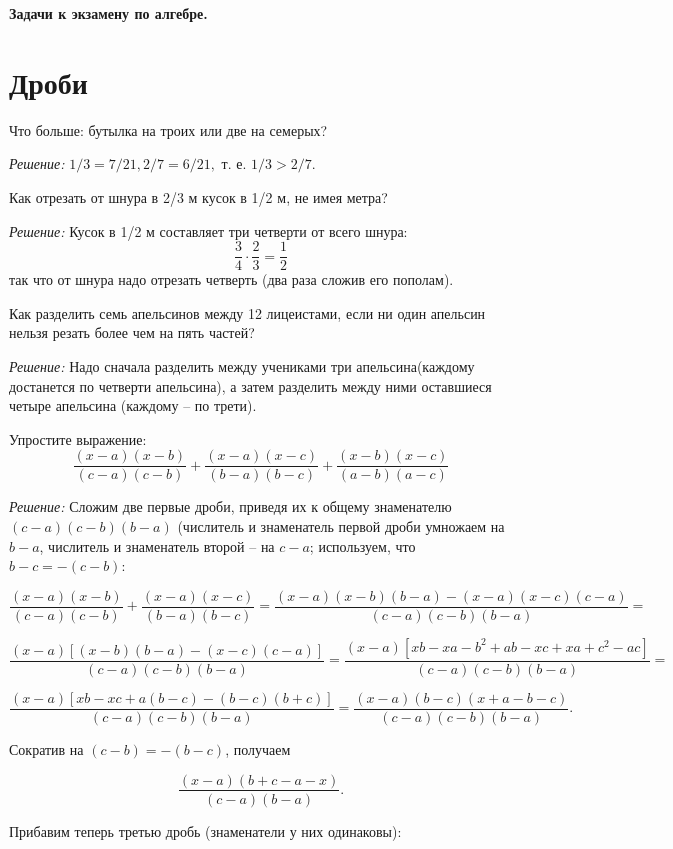 \centerline{\Huge \bf  Задачи к экзамену по алгебре.}

\section{\Large \bf Дроби}

 Что больше: бутылка на троих или две на семерых?

\textit{Решение:} $1/3 = 7/21, 2/7 = 6/21,$ т. е. $1/3 > 2/7.$

 Как отрезать от шнура в 2/3 м кусок в 1/2 м, не имея метра?

\textit{Решение:} Кусок в 1/2 м составляет три четверти от всего шнура:
\[ \dfrac{3}{4} \cdot \dfrac{2}{3} = \dfrac{1}{2}\]
так что от шнура надо отрезать четверть (два раза сложив его пополам).


 Как разделить семь апельсинов между 12 лицеистами, если ни один апельсин нельзя резать более чем на пять частей?

\textit{Решение:} Надо сначала разделить между учениками три апельсина(каждому достанется по четверти апельсина), а затем разделить между ними оставшиеся четыре апельсина (каждому $–$ по трети).

Упростите выражение:
\[
\frac{(x-a)(x-b)}{(c-a)(c-b)} + \frac{(x-a)(x-c)}{(b-a)(b-c)} + \frac{(x-b)(x-c)}{(a-b)(a-c)}
\]



\textit{Решение:} Сложим две первые дроби, приведя их к общему знаменателю \((c-a)(c-b)(b-a)\) (числитель и знаменатель первой дроби умножаем на \(b-a\), числитель и знаменатель второй -- на \(c-a\); используем, что $b - c = -(c - b):$


\[
\frac{(x-a)(x-b)}{(c-a)(c-b)} + \frac{(x-a)(x-c)}{(b-a)(b-c)} =
\frac{(x-a)(x-b)(b-a)-(x-a)(x-c)(c-a)}{(c-a)(c-b)(b-a)} =
\]

\[
\frac{(x-a)[(x-b)(b-a)-(x-c)(c-a)]}{(c-a)(c-b)(b-a)} =
\frac{(x-a)[xb - xa - b^2 + ab - xc + xa + c^2 - ac]}{(c-a)(c-b)(b-a)} =
\]

\[
\frac{(x-a)[xb - xc + a(b - c) - (b - c)(b + c)]}{(c-a)(c-b)(b-a)} =
\frac{(x-a)(b-c)(x + a - b - c)}{(c-a)(c-b)(b-a)}.
\]

Сократив на \((c-b) = -(b-c)\), получаем

\[
\frac{(x-a)(b+c-a-x)}{(c-a)(b-a)}.
\]

\newpage

\hspace{3mm}

Прибавим теперь третью дробь (знаменатели у них одинаковы):

